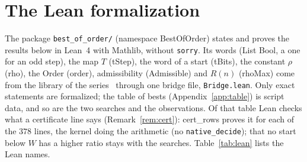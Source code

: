 \documentclass[10pt,a4paper,titlepage]{article}
\newcommand{\lean}[1]{\textsf{#1}}
\theoremstyle{plain}
\theoremstyle{definition}
\theoremstyle{remark}
\begin{document}
\section{The Lean formalization}
\label{sec:lean}
The package \texttt{best\_of\_order/} (namespace \lean{BestOfOrder}) states and proves the
results below in Lean~4 with Mathlib, without \texttt{sorry}. Its words (\lean{List Bool}, a one for an
odd step), the map $T$ (\lean{tStep}), the word of a start (\lean{tBits}), the constant $\rho$
(\lean{rho}), the Order (\lean{order}), admissibility (\lean{Admissible}) and $R(n)$ (\lean{rhoMax}) come
from the library of the series~\cite{Paper2} through one bridge file, \texttt{Bridge.lean}. Only exact
statements are formalized; the table of bests (Appendix~\ref{app:table}) is script data, and so are
the two searches and the observations. Of that table Lean checks what a certificate line says
(Remark~\ref{rem:cert}): \lean{cert\_rows} proves it for each of the $378$ lines, the kernel doing the
arithmetic (no \texttt{native\_decide}); that no start below $W$ has a higher ratio stays with the searches. Table~\ref{tab:lean} lists the Lean names.
\end{document}
